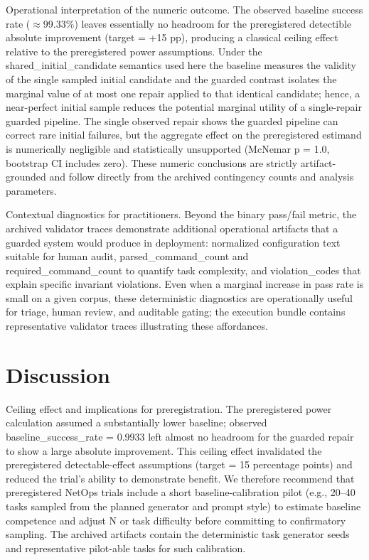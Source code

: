 \documentclass[conference]{IEEEtran}
\begin{document}
Operational interpretation of the numeric outcome. The observed baseline success rate (\ensuremath{\approx}99.33\%) leaves essentially no headroom for the preregistered detectible absolute improvement (target = +15 pp), producing a classical ceiling effect relative to the preregistered power assumptions. Under the shared\_initial\_candidate semantics used here the baseline measures the validity of the single sampled initial candidate and the guarded contrast isolates the marginal value of at most one repair applied to that identical candidate; hence, a near-perfect initial sample reduces the potential marginal utility of a single-repair guarded pipeline. The single observed repair shows the guarded pipeline can correct rare initial failures, but the aggregate effect on the preregistered estimand is numerically negligible and statistically unsupported (McNemar p = 1.0, bootstrap CI includes zero). These numeric conclusions are strictly artifact-grounded and follow directly from the archived contingency counts and analysis parameters.

Contextual diagnostics for practitioners. Beyond the binary pass/fail metric, the archived validator traces demonstrate additional operational artifacts that a guarded system would produce in deployment: normalized configuration text suitable for human audit, parsed\_command\_count and required\_command\_count to quantify task complexity, and violation\_codes that explain specific invariant violations. Even when a marginal increase in pass rate is small on a given corpus, these deterministic diagnostics are operationally useful for triage, human review, and auditable gating; the execution bundle contains representative validator traces illustrating these affordances.

\section{Discussion}
Ceiling effect and implications for preregistration. The preregistered power calculation assumed a substantially lower baseline; observed baseline\_success\_rate = 0.9933 left almost no headroom for the guarded repair to show a large absolute improvement. This ceiling effect invalidated the preregistered detectable-effect assumptions (target = 15 percentage points) and reduced the trial's ability to demonstrate benefit. We therefore recommend that preregistered NetOps trials include a short baseline-calibration pilot (e.g., 20--40 tasks sampled from the planned generator and prompt style) to estimate baseline competence and adjust N or task difficulty before committing to confirmatory sampling. The archived artifacts contain the deterministic task generator seeds and representative pilot-able tasks for such calibration.
\end{document}
